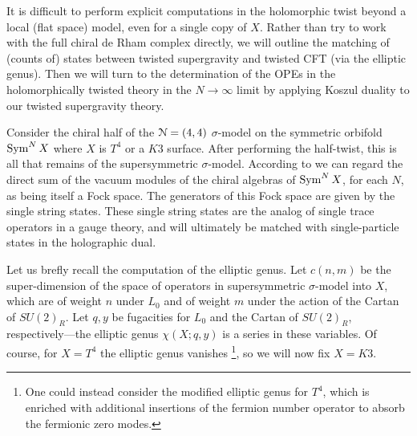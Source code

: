 \documentclass[../main.tex]{subfiles}
\begin{document}
It is difficult to perform explicit computations in the holomorphic twist beyond a local (flat space) model, even for a single copy of $X$. Rather than try to work with the full chiral de Rham complex directly, we will outline the matching of (counts of) states between twisted supergravity and twisted CFT (via the elliptic genus). Then we will turn to the determination of the OPEs in the holomorphically twisted theory in the $N \rightarrow \infty$ limit by applying Koszul duality to our twisted supergravity theory. 

%



Consider the chiral half of the $\mathcal N= (4,4)$ $\sigma$-model on the symmetric orbifold  $\operatorname{Sym}^N X$ where $X$ is $T^4$ or a $K3$ surface. 
After performing the half-twist, this is all that remains of the supersymmetric $\sigma$-model.
 According to \cite{DMVV} we can regard the direct sum of the vacuum modules of the chiral algebras of $\operatorname{Sym}^N X$, for each $N$, as being itself a Fock space. The generators of this Fock space are given by the single string states. These single string states are the analog of single trace operators in a gauge theory, and will ultimately be matched with single-particle states in the holographic dual.

Let us brefly recall the computation of the elliptic genus. Let $c(n,m)$ be the super-dimension of the space of operators in supersymmetric $\sigma$-model into $X$, which are of weight $n$ under $L_0$ and of weight $m$ under the action of the Cartan of $SU(2)_R$.  
Let $q,y$ be fugacities for $L_0$ and the Cartan of $SU(2)_R$, respectively---the elliptic genus $\chi(X;q,y)$ is a series in these variables.  
Of course, for $X = T^4$ the elliptic genus vanishes \footnote{One could instead consider the modified elliptic genus for $T^4$, which is enriched with additional insertions of the fermion number operator to absorb the fermionic zero modes.}, so we will now fix $X = K3$.
\end{document}
